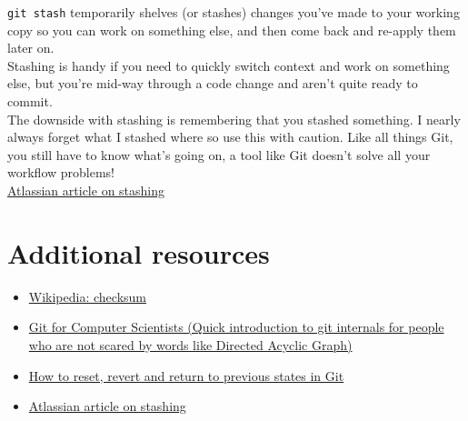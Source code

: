 \texttt{git stash} temporarily shelves (or stashes) changes you've made to your working copy so you can work on something else, and then come back and re-apply them later on. 
\\

Stashing is handy if you need to quickly switch context and work on something else, but you're mid-way through a code change and aren't quite ready to commit.
\\

The downside with stashing is remembering that you stashed something. I nearly always forget what I stashed where so use this with caution. Like all things Git, you still have to know what's going on, a tool like Git doesn't solve all your workflow problems!
\\

\href{https://www.atlassian.com/git/tutorials/saving-changes/git-stash}{Atlassian article on stashing}

\section{Additional resources}

\begin{itemize}[leftmargin=*]
    \item \href{https://en.wikipedia.org/wiki/Checksum}{Wikipedia: checksum}
	\item \href{https://eagain.net/articles/git-for-computer-scientists/}{Git for Computer Scientists (Quick introduction to git internals for people who are not scared by words like Directed Acyclic Graph)}
	\item \href{https://opensource.com/article/18/6/git-reset-revert-rebase-commands}{How to reset, revert and return to previous states in Git}
	\item \href{https://www.atlassian.com/git/tutorials/saving-changes/git-stash}{Atlassian article on stashing}
\end{itemize}


